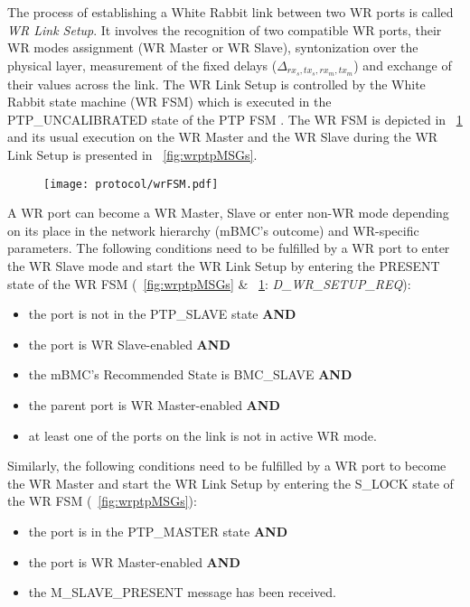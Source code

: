 The process of establishing a White Rabbit link between two WR ports
is called \textit{WR Link Setup}. It involves the
recognition of two compatible WR ports, their WR modes assignment
(WR Master or WR Slave), syntonization over the physical layer, 
measurement of the fixed delays ($\Delta_{rx_s,tx_s,rx_m,tx_m}$) and 
exchange of their values across the link. The WR Link Setup is controlled by the
White Rabbit state machine (WR FSM) which is executed in the PTP\_UNCALIBRATED 
state of the PTP FSM . 
The WR FSM is depicted in \figurename~\ref{fig:wrFSM} and 
its usual execution on the WR Master and the WR Slave during the WR Link Setup is
presented in \figurename~\ref{fig:wrptpMSGs}.
\begin{figure}[!t]
\centering
\texttt{[image: protocol/wrFSM.pdf]}
\caption{}
\label{fig:wrFSM}
\end{figure}

A WR port can become a WR Master, Slave or enter non-WR mode depending on its 
place in the network hierarchy (mBMC's outcome) and WR-specific parameters. 
The following conditions need to be fulfilled by a WR port 
to enter the WR Slave mode and start the WR Link Setup by entering the PRESENT state of the WR FSM
(\figurename~\ref{fig:wrptpMSGs} \& \figurename~\ref{fig:wrFSM}: \textit{D\_WR\_SETUP\_REQ}):
\begin{itemize}
\item the port is not in the PTP\_SLAVE state \textbf{AND}
\item the port is WR Slave-enabled \textbf{AND}
\item the mBMC's Recommended State is BMC\_SLAVE \textbf{AND}
\item the parent port is WR Master-enabled \textbf{AND}
\item at least one of the ports on the link is not in active WR mode.
\end{itemize}
Similarly, the following conditions need to be fulfilled by a WR port 
to become the WR Master and start the WR Link Setup by entering the S\_LOCK state of the WR FSM
(\figurename~\ref{fig:wrptpMSGs}):
\begin{itemize}
\item the port is in the PTP\_MASTER state \textbf{AND}
\item the port is WR Master-enabled \textbf{AND}
\item the M\_SLAVE\_PRESENT message has been received.
\end{itemize}

